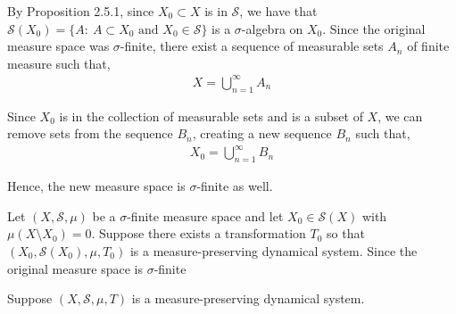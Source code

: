 \documentclass[12pt]{article}
\newenvironment{problem}[2][Problem]{\begin{trivlist}
\item[\hskip \labelsep {\bfseries #1}\hskip \labelsep {\bfseries #2.}]}{\end{trivlist}}
\begin{document}
By Proposition 2.5.1, since $X_0 \subset X$ is in $\mathcal{S}$, we have that $\mathcal{S}(X_0) = \{A: \ A \subset X_0 \text{ and } X_0 \in \mathcal{S}\}$ is a $\sigma$-algebra on $X_0$. Since the original measure space was $\sigma$-finite, there exist a sequence of measurable sets $A_n$ of finite measure such that,
\begin{align*}
X = \bigcup_{n=1}^{\infty} A_n
\end{align*}

Since $X_0$ is in the collection of measurable sets and is a subset of $X$, we can remove sets from the sequence $B_n$, creating a new sequence $B_n$ such that,
\begin{align*}
X_0 = \bigcup_{n=1}^{\infty} B_n
\end{align*}

Hence, the new measure space is $\sigma$-finite as well.

\begin{problem}{3}
\end{problem}

Let $(X, \mathcal{S}, \mu)$ be a $\sigma$-finite measure space and let $X_0 \in \mathcal{S}(X)$ with $\mu(X \setminus X_0) = 0$. Suppose there exists a transformation $T_0$ so that $(X_0, \mathcal{S}(X_0), \mu, T_0)$ is a measure-preserving dynamical system. Since the original measure space is $\sigma$-finite

\begin{problem}{4}
\end{problem}

Suppose $(X, \mathcal{S}, \mu, T)$ is a measure-preserving dynamical system. 
\end{document}
